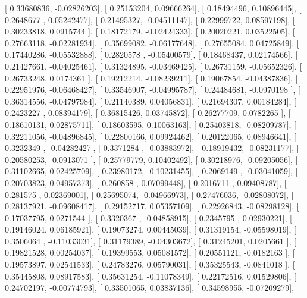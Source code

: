 \documentclass{article}
\begin{document}
       [ 0.33680836, -0.02826203],
       [ 0.25153204,  0.09666264],
       [ 0.18494496,  0.10896445],
       [ 0.2648677 ,  0.05242477],
       [ 0.21495327, -0.04511147],
       [ 0.22999722,  0.08597198],
       [ 0.30233818,  0.0915744 ],
       [ 0.18172179, -0.02424333],
       [ 0.20020221,  0.03522505],
       [ 0.27663118, -0.02281934],
       [ 0.35699082, -0.06177648],
       [ 0.27655084,  0.04725849],
       [ 0.17440286, -0.05532888],
       [ 0.2820578 , -0.05400579],
       [ 0.18468437,  0.02174566],
       [ 0.21427661, -0.04025461],
       [ 0.31324895, -0.03469425],
       [ 0.26731159, -0.05652326],
       [ 0.26733248,  0.0174361 ],
       [ 0.19212214, -0.08239211],
       [ 0.19067854, -0.04387836],
       [ 0.22951976, -0.06468427],
       [ 0.33546907, -0.04995787],
       [ 0.24484681, -0.0970198 ],
       [ 0.36314556, -0.04797984],
       [ 0.21140389,  0.04056831],
       [ 0.21694307,  0.00184284],
       [ 0.2423227 ,  0.08394179],
       [ 0.36815426,  0.03745872],
       [ 0.26277709,  0.0782265 ],
       [ 0.18610131,  0.02875711],
       [ 0.18603595,  0.10063163],
       [ 0.25403818, -0.08209787],
       [ 0.32211056, -0.04896845],
       [ 0.22800166,  0.09924462],
       [ 0.20122065,  0.08946641],
       [ 0.3232349 , -0.04282427],
       [ 0.3371284 , -0.03883972],
       [ 0.18919432, -0.08231177],
       [ 0.20580253, -0.0913071 ],
       [ 0.25779779,  0.10402492],
       [ 0.30218976, -0.09205056],
       [ 0.31102665,  0.02425709],
       [ 0.23980172, -0.10231455],
       [ 0.2069149 , -0.03041059],
       [ 0.20703823,  0.04957373],
       [ 0.260858  ,  0.07099448],
       [ 0.2016711 ,  0.09408787],
       [ 0.281575  ,  0.02369001],
       [ 0.25695074, -0.04966973],
       [ 0.27476036, -0.02808072],
       [ 0.28137921, -0.09608417],
       [ 0.29152717,  0.05357109],
       [ 0.22926843, -0.08298128],
       [ 0.17037795,  0.0271544 ],
       [ 0.3320367 , -0.04858915],
       [ 0.2345795 ,  0.02930221],
       [ 0.19146024,  0.06185921],
       [ 0.19073274,  0.00445039],
       [ 0.31319154, -0.05598019],
       [ 0.3506064 , -0.11033031],
       [ 0.31179389, -0.04303672],
       [ 0.31245201,  0.0205661 ],
       [ 0.19821528,  0.00254037],
       [ 0.19399553,  0.05081572],
       [ 0.20551121, -0.0182163 ],
       [ 0.19573897,  0.02541533],
       [ 0.24783276,  0.05790031],
       [ 0.35325543, -0.0841018 ],
       [ 0.35445808,  0.08917583],
       [ 0.35631254, -0.11078349],
       [ 0.22172516,  0.01529806],
       [ 0.24702197, -0.00774793],
       [ 0.33501065,  0.03837136],
       [ 0.34598955, -0.07209279],
\end{document}
